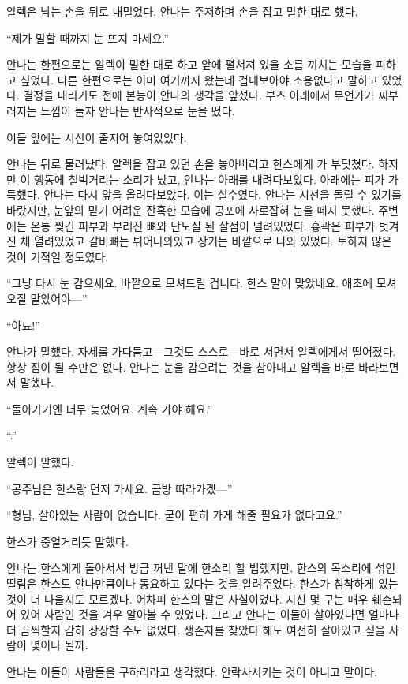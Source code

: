 알렉은 남는 손을 뒤로 내밀었다. 안나는 주저하며 손을 잡고 말한 대로 했다.

``제가 말할 때까지 눈 뜨지 마세요.''

안나는 한편으로는 알렉이 말한 대로 하고 앞에 펼쳐져 있을 소름 끼치는 모습을 피하고 싶었다. 다른 한편으로는 이미 여기까지 왔는데 겁내보아야 소용없다고 말하고 있었다. 결정을 내리기도 전에 본능이 안나의 생각을 앞섰다. 부츠 아래에서 무언가가 찌부러지는 느낌이 들자 안나는 반사적으로 눈을 떴다.

이들 앞에는 시신이 줄지어 놓여있었다.

안나는 뒤로 물러났다. 알렉을 잡고 있던 손을 놓아버리고 한스에게 가 부딪쳤다. 하지만 이 행동에 철벅거리는 소리가 났고, 안나는 아래를 내려다보았다. 아래에는 피가 가득했다. 안나는 다시 앞을 올려다보았다. 이는 실수였다. 안나는 시선을 돌릴 수 있기를 바랐지만, 눈앞의 믿기 어려운 잔혹한 모습에 공포에 사로잡혀 눈을 떼지 못했다. 주변에는 온통 찢긴 피부과 부러진 뼈와 난도질 된 살점이 널려있었다. 흉곽은 피부가 벗겨진 채 열려있었고 갈비뼈는 튀어나와있고 장기는 바깥으로 나와 있었다. 토하지 않은 것이 기적일 정도였다.

``그냥 다시 눈 감으세요. 바깥으로 모셔드릴 겁니다. 한스 말이 맞았네요. 애초에 모셔오질 말았어야—''

``아뇨!''

안나가 말했다. 자세를 가다듬고—그것도 스스로—바로 서면서 알렉에게서 떨어졌다. 항상 짐이 될 수만은 없다. 안나는 눈을 감으려는 것을 참아내고 알렉을 바로 바라보면서 말했다.

``돌아가기엔 너무 늦었어요. 계속 가야 해요.''

``.''

알렉이 말했다.

``공주님은 한스랑 먼저 가세요. 금방 따라가겠—''

``형님, 살아있는 사람이 없습니다. 굳이 편히 가게 해줄 필요가 없다고요.''

한스가 중얼거리듯 말했다.

안나는 한스에게 돌아서서 방금 꺼낸 말에 한소리 할 법했지만, 한스의 목소리에 섞인 떨림은 한스도 안나만큼이나 동요하고 있다는 것을 알려주었다. 한스가 침착하게 있는 것이 더 나을지도 모르겠다. 어차피 한스의 말은 사실이었다. 시신 몇 구는 매우 훼손되어 있어 사람인 것을 겨우 알아볼 수 있었다. 그리고 안나는 이들이 살아있다면 얼마나 더 끔찍할지 감히 상상할 수도 없었다. 생존자를 찾았다 해도 여전히 살아있고 싶을 사람이 몇이나 될까.

안나는 이들이 사람들을 구하리라고 생각했다. 안락사시키는 것이 아니고 말이다.

